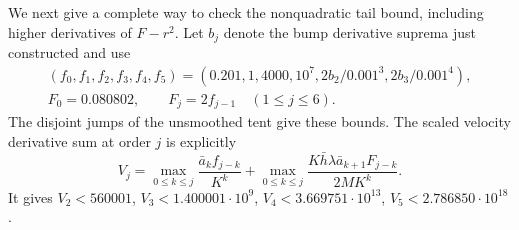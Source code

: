 \documentclass[11pt]{article}
\theoremstyle{definition}\newtheorem{definition}[theorem]{Definition}
\theoremstyle{remark}\newtheorem{remark}[theorem]{Remark}
\begin{document}
We next give a complete way to check the nonquadratic tail bound, including
higher derivatives of $F-r^2$. Let $b_j$ denote the bump derivative
suprema just constructed and use
\[
\begin{gathered}
 (f_0,f_1,f_2,f_3,f_4,f_5)
 =(0.201,1,4000,10^7,2b_2/0.001^3,2b_3/0.001^4),\\
 F_0=0.080802,\qquad F_j=2f_{j-1}\quad(1\le j\le6).
\end{gathered}
\]
The disjoint jumps of the unsmoothed tent give these bounds. The scaled
velocity derivative sum at order $j$ is explicitly
\begin{equation}
 V_j=\max_{0\le k\le j}\frac{\bar a_k f_{j-k}}{K^k}
   +\max_{0\le k\le j}\frac{K\bar h\lambda\bar a_{k+1}F_{j-k}}
                                      {2MK^k}.
 \label{prep:velocity-jets}
\end{equation}
It gives $V_2<560001$, $V_3<1.400001\cdot10^9$,
$V_4<3.669751\cdot10^{13}$, $V_5<2.786850\cdot10^{18}$.
\end{document}
